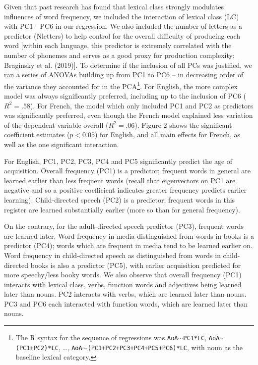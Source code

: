 \documentclass[10pt, letterpaper]{article}
\begin{document}
Given that past research has found that lexical class strongly modulates
influences of word frequency, we included the interaction of lexical
class (LC) with PC1 - PC6 in our regression. We also included the number
of letters as a predictor (Nletters) to help control for the overall
difficulty of producing each word {[}within each language, this
predictor is extremely correlated with the number of phonemes and serves
as a good proxy for production complexity; Braginsky et al. (2019){]}.
To determine if the inclusion of all PCs was justified, we ran a series
of ANOVAs building up from PC1 to PC6 -- in decreasing order of the
variance they accounted for in the PCA\footnote{The R syntax for the
  sequence of regressions was \texttt{AoA}\(\sim\)\texttt{PC1*LC},
  \texttt{AoA}\(\sim\)\texttt{(PC1+PC2)*LC}, \ldots,
  \texttt{AoA}\(\sim\)\texttt{(PC1+PC2+PC3+PC4+PC5+PC6)*LC}, with noun
  as the baseline lexical category.}. For English, the more complex
model was always significantly preferred, including up to the inclusion
of PC6 (\(R^2 = .58\)). For French, the model which only included PC1
and PC2 as predictors was significantly preferred, even though the
French model explained less variation of the dependent variable overall
(\(R^2 = .06\)). Figure 2 shows the significant coefficient estimates
(\(p<0.05\)) for English, and all main effects for French, as well as
the one significant interaction.

For English, PC1, PC2, PC3, PC4 and PC5 significantly predict the age of
acquisition. Overall frequency (PC1) is a predictor; frequent words in
general are learned earlier than less frequent words (recall that
eigenvectors on PC1 are negative and so a positive coefficient indicates
greater frequency predicts earlier learning). Child-directed speech
(PC2) is a predictor; frequent words in this register are learned
substantially earlier (more so than for general frequency).

On the contrary, for the adult-directed speech predictor (PC3), frequent
words are learned later. Word frequency in media distinguished from
words in books is a predictor (PC4); words which are frequent in media
tend to be learned earlier on. Word frequency in child-directed speech
as distinguished from words in child-directed books is also a predictor
(PC5), with earlier acquisition predicted for more speechy/less booky
words. We also observe that overall frequency (PC1) interacts with
lexical class, verbs, function words and adjectives being learned later
than nouns. PC2 interacts with verbs, which are learned later than
nouns. PC3 and PC6 each interacted with function words, which are
learned later than nouns.
\end{document}
